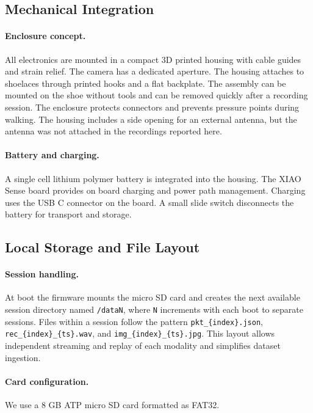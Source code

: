 \documentclass[manuscript,review,anonymous]{acmart}
\begin{document}
\subsection{Mechanical Integration}
\paragraph{Enclosure concept.}
All electronics are mounted in a compact 3D printed housing with cable guides and strain relief. The camera has a dedicated aperture. The housing attaches to shoelaces through printed hooks and a flat backplate. The assembly can be mounted on the shoe without tools and can be removed quickly after a recording session. The enclosure protects connectors and prevents pressure points during walking.
The housing includes a side opening for an external antenna, but the antenna was not attached in the recordings reported here.

\paragraph{Battery and charging.}
A single cell lithium polymer battery is integrated into the housing. The XIAO Sense board provides on board charging and power path management. Charging uses the USB C connector on the board. A small slide switch disconnects the battery for transport and storage.

\subsection{Local Storage and File Layout}
\paragraph{Session handling.}
At boot the firmware mounts the micro SD card and creates the next available session directory named \texttt{/dataN}, where \texttt{N} increments with each boot to separate sessions. Files within a session follow the pattern \texttt{pkt\_\{index\}.json}, \texttt{rec\_\{index\}\_\{ts\}.wav}, and \texttt{img\_\{index\}\_\{ts\}.jpg}. This layout allows independent streaming and replay of each modality and simplifies dataset ingestion.

\paragraph{Card configuration.}
We use a 8 GB ATP micro SD card formatted as FAT32.
\end{document}
